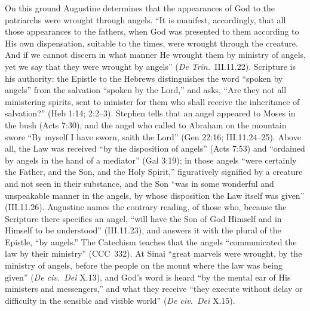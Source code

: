 On this ground Augustine determines that the appearances of God to the
patriarchs were wrought through angels. ``It is manifest, accordingly,
that all those appearances to the fathers, when God was presented to them
according to His own dispensation, suitable to the times, were wrought
through the creature. And if we cannot discern in what manner He wrought
them by ministry of angels, yet we say that they were wrought by angels''
(\emph{De Trin.}\ III.11.22). Scripture is his authority: the Epistle to
the Hebrews distinguishes the word ``spoken by angels'' from the salvation
``spoken by the Lord,'' and asks, ``Are they not all ministering spirits,
sent to minister for them who shall receive the inheritance of
salvation?'' (Heb 1:14; 2:2--3). Stephen tells that an angel appeared to
Moses in the bush (Acts 7:30), and the angel who called to Abraham on the
mountain swore ``By myself I have sworn, saith the Lord'' (Gen 22:16;
III.11.24--25).
Above all, the Law was received ``by the disposition of angels'' (Acts
7:53) and ``ordained by angels in the hand of a mediator'' (Gal 3:19); in
those angels ``were certainly the Father, and the Son, and the Holy
Spirit,'' figuratively signified by a creature and not seen in their
substance, and the Son ``was in some wonderful and unspeakable manner in
the angels, by whose disposition the Law itself was given'' (III.11.26).
Augustine names the contrary reading, of those who, because the Scripture
there specifies an angel, ``will have the Son of God Himself and in
Himself to be understood'' (III.11.23), and answers it with the plural of
the Epistle, ``by angels.'' The Catechism teaches that the angels
``communicated the law by their ministry'' (CCC~332). At Sinai ``great
marvels were wrought, by the ministry of angels, before the people on the
mount where the law was being given'' (\emph{De civ.\ Dei} X.13), and
God's word is heard
``by the mental ear of His ministers and messengers,'' and what they
receive ``they execute without delay or difficulty in the sensible and
visible world'' (\emph{De civ.\ Dei} X.15).

